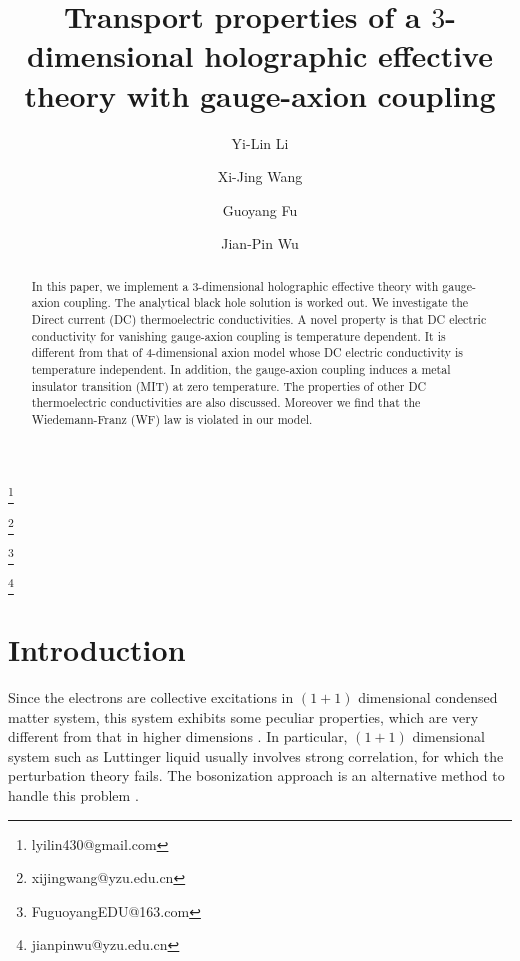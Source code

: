 \documentclass[preprint,onecolumn,nofootinbib]{revtex4}
\begin{document}
\title{Transport properties of a $3$-dimensional holographic effective theory with gauge-axion coupling}


\author{Yi-Lin Li}
\thanks{lyilin430@gmail.com}
\author{Xi-Jing Wang}
\thanks{xijingwang@yzu.edu.cn} 	
\author{Guoyang Fu}
\thanks{FuguoyangEDU@163.com}
\author{Jian-Pin Wu}
\thanks{jianpinwu@yzu.edu.cn}

\begin{abstract}
	
In this paper, we implement a $3$-dimensional holographic effective theory with gauge-axion coupling. The analytical black hole solution is  worked out. We investigate the Direct current (DC) thermoelectric conductivities. 
A novel property is that DC electric conductivity for vanishing gauge-axion coupling is temperature dependent. It is different from that of $4$-dimensional axion model whose DC electric conductivity is temperature independent.
In addition, the gauge-axion coupling induces a metal insulator transition (MIT) at zero temperature.
The properties of other DC thermoelectric conductivities are also discussed. Moreover we find that the Wiedemann-Franz (WF) law is violated in our model.

\end{abstract}

\maketitle

\section{Introduction}
Since the electrons are collective excitations in $(1+1)$ dimensional condensed matter system, this system exhibits some peculiar properties, which are very different from that in higher dimensions \cite{Schulz:98}. In particular, $(1+1)$ dimensional system such as Luttinger liquid usually involves strong correlation, for which the perturbation theory fails. The bosonization approach is an alternative method to handle this problem \cite{Schulz:98}.
\end{document}
